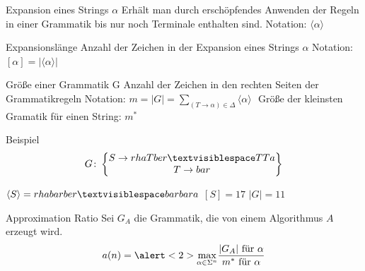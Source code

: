 \documentclass[xcolor=dvipsnames]{beamer}
\begin{document}
\begin{frame}{\FrameName}
\begin{block}{Expansion  eines Strings $\alpha$}
	\Gap
	Erhält man durch erschöpfendes Anwenden der Regeln in einer Grammatik bis nur noch Terminale enthalten sind. \linebreak
	Notation: $\langle \alpha \rangle$
\end{block}
\end{frame}

\begin{frame}{\FrameName}
\begin{block}{Expansionslänge}
	\Gap
	Anzahl der Zeichen in der Expansion eines Strings $\alpha$ \linebreak
	Notation: $[\alpha]  = \lvert \langle \alpha \rangle \lvert$
\end{block}
\end{frame}

\begin{frame}{\FrameName}
\begin{block}{Größe einer Grammatik G}
	\Gap
	Anzahl der Zeichen in den rechten Seiten der Grammatikregeln\linebreak
	Notation: $m = \lvert G \lvert = \sum\limits_{(T \rightarrow \alpha) \in \Delta} \langle \alpha \rangle$ \linebreak $ $\linebreak
	Größe der kleinsten Gramatik für einen String: $m^*$
\end{block}
\end{frame}

\begin{frame}{\FrameName}
\begin{block}{Beispiel}
	$$
	G \colon \begin{Bmatrix} 
		S \rightarrow rhaTber \textvisiblespace TTa \\
		T \rightarrow bar
	\end{Bmatrix}
	$$
	
	$\langle S \rangle = rhabarber \textvisiblespace barbara$ \linebreak
	$[S] = 17$ \linebreak
	$\lvert G \lvert = 11$
\end{block}
\end{frame}

\begin{frame}{\FrameName}
\begin{block}{Approximation Ratio}
	\Gap
	Sei $G_A$ die Grammatik, die von einem Algorithmus $A$ erzeugt wird.
	$$
	a(n) = \alert<2>{\max\limits_{\alpha \in \Sigma^n}}\frac{
		\textrm{$\lvert G_A \lvert$ für $\alpha$}
	}{
		\textrm{$m^*$ für $\alpha$}
	}
	$$
	
\end{block}
\end{frame}
\end{document}
